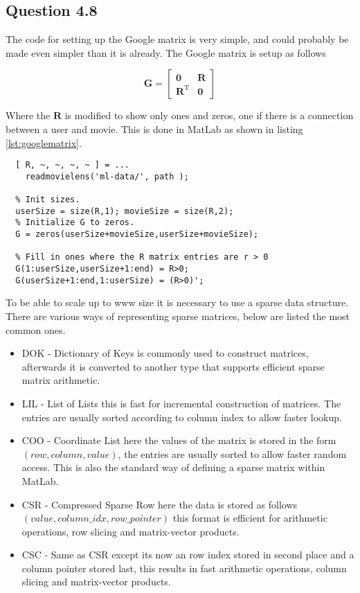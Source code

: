 \subsection*{Question 4.8}

The code for setting up the Google matrix is very simple, and could
probably be made even simpler than it is already. The Google matrix is
setup as follows

\begin{equation*}
  \mathbf{G} =
  \left[ \begin{array}{c|c}
      \mathbf{0} & \mathbf{R} \\
      \hline
      \mathbf{R}^{\textrm{T}} & \mathbf{0}
\end{array} \right]      
\end{equation*}

Where the $\mathbf{R}$ is modified to show only ones and zeros, one if
there is a connection between a user and movie. This is done in MatLab
as shown in listing \ref{lst:googlematrix}.

\begin{lstlisting}[caption={Creation of the Google matrix in Matlab}, captionpos=b,
    label={lst:googlematrix}, float=h, numbers=none]
  % Read in the rating matrix R given the path.
  [ R, ~, ~, ~, ~ ] = ...
    readmovielens('ml-data/', path );
  
  % Init sizes.
  userSize = size(R,1); movieSize = size(R,2);
  % Initialize G to zeros.
  G = zeros(userSize+movieSize,userSize+movieSize);
  
  % Fill in ones where the R matrix entries are r > 0
  G(1:userSize,userSize+1:end) = R>0;
  G(userSize+1:end,1:userSize) = (R>0)';
\end{lstlisting}

To be able to scale up to www size it is necessary to use a sparse
data structure. There are various ways of representing sparse
matrices, below are listed the most common ones.
\begin{itemize}
\item DOK - Dictionary of Keys is commonly used to construct matrices,
  afterwards it is converted to another type that supports efficient
  sparse matrix arithmetic.
\item LIL - List of Lists this is fast for incremental construction of
  matrices. The entries are usually sorted according to column index
  to allow faster lookup.
\item COO - Coordinate List here the values of the matrix is stored in
  the form $(\mathit{row}, \mathit{column}, \mathit{value})$, the
  entries are usually sorted to allow faster random access. This is
  also the standard way of defining a sparse matrix within MatLab.
\item CSR - Compressed Sparse Row here the data is stored as follows
  $(\mathit{value}, \mathit{column\_idx}, \mathit{row\_pointer})$ this
  format is efficient for arithmetic operations, row slicing and
  matrix-vector products.
\item CSC - Same as CSR except its now an row index stored in second
  place and a column pointer stored last, this results in fast
  arithmetic operations, column slicing and matrix-vector products.
\end{itemize}
